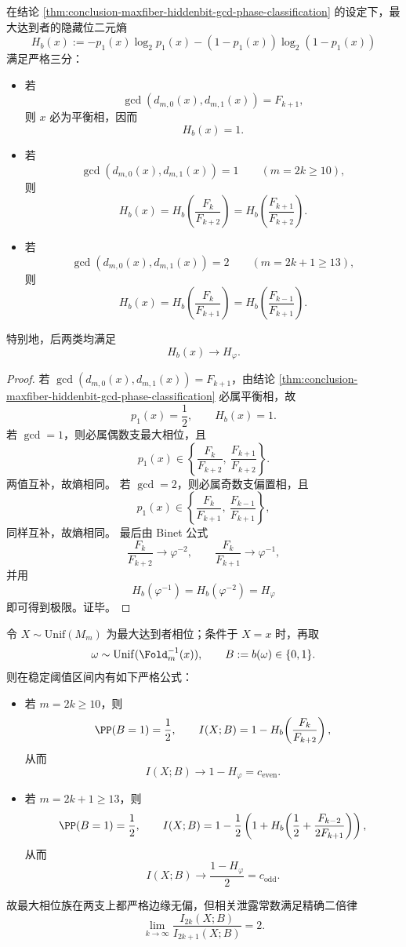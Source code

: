\begin{corollary}\label{cor:conclusion-maxfiber-gcd-determines-hiddenbit-entropy-class}
在结论 \ref{thm:conclusion-maxfiber-hiddenbit-gcd-phase-classification} 的设定下，最大达到者的隐藏位二元熵
\[
H_b(x):=
-p_1(x)\log_2 p_1(x)-(1-p_1(x))\log_2(1-p_1(x))
\]
满足严格三分：
\begin{itemize}
  \item 若
  \[
  \gcd(d_{m,0}(x),d_{m,1}(x))=F_{k+1},
  \]
  则 \(x\) 必为平衡相，因而
  \[
  H_b(x)=1.
  \]
  \item 若
  \[
  \gcd(d_{m,0}(x),d_{m,1}(x))=1
  \qquad (m=2k\ge 10),
  \]
  则
  \[
  H_b(x)
  =
  H_b\!\left(\frac{F_k}{F_{k+2}}\right)
  =
  H_b\!\left(\frac{F_{k+1}}{F_{k+2}}\right).
  \]
  \item 若
  \[
  \gcd(d_{m,0}(x),d_{m,1}(x))=2
  \qquad (m=2k+1\ge 13),
  \]
  则
  \[
  H_b(x)
  =
  H_b\!\left(\frac{F_k}{F_{k+1}}\right)
  =
  H_b\!\left(\frac{F_{k-1}}{F_{k+1}}\right).
  \]
\end{itemize}
特别地，后两类均满足
\[
H_b(x)\longrightarrow H_\varphi.
\]
\end{corollary}

\begin{proof}
若 \(\gcd(d_{m,0}(x),d_{m,1}(x))=F_{k+1}\)，由结论 \ref{thm:conclusion-maxfiber-hiddenbit-gcd-phase-classification} 必属平衡相，故
\[
p_1(x)=\frac12,
\qquad
H_b(x)=1.
\]
若 \(\gcd=1\)，则必属偶数支最大相位，且
\[
p_1(x)\in
\left\{
\frac{F_k}{F_{k+2}},\ \frac{F_{k+1}}{F_{k+2}}
\right\}.
\]
两值互补，故熵相同。
若 \(\gcd=2\)，则必属奇数支偏置相，且
\[
p_1(x)\in
\left\{
\frac{F_k}{F_{k+1}},\ \frac{F_{k-1}}{F_{k+1}}
\right\},
\]
同样互补，故熵相同。
最后由 Binet 公式
\[
\frac{F_k}{F_{k+2}}\to\varphi^{-2},
\qquad
\frac{F_k}{F_{k+1}}\to\varphi^{-1},
\]
并用
\[
H_b(\varphi^{-1})=H_b(\varphi^{-2})=H_\varphi
\]
即可得到极限。证毕。
\end{proof}

\begin{theorem}\label{thm:conclusion-maxfiber-hiddenbit-unbiased-marginal-biased-correlation}
令 \(X\sim \mathrm{Unif}(M_m)\) 为最大达到者相位；条件于 \(X=x\) 时，再取
\[
\omega\sim \mathrm{Unif}(\Fold_m^{-1}(x)),
\qquad
B:=b(\omega)\in\{0,1\}.
\]
则在稳定阈值区间内有如下严格公式：
\begin{itemize}
  \item 若 \(m=2k\ge 10\)，则
  \[
  \PP(B=1)=\frac12,
  \qquad
  I(X;B)=1-H_b\!\left(\frac{F_k}{F_{k+2}}\right),
  \]
  从而
  \[
  I(X;B)\longrightarrow 1-H_\varphi=c_{\mathrm{even}}.
  \]
  \item 若 \(m=2k+1\ge 13\)，则
  \[
  \PP(B=1)=\frac12,
  \qquad
  I(X;B)
  =
  1-\frac12\left(1+H_b\!\left(\frac12+\frac{F_{k-2}}{2F_{k+1}}\right)\right),
  \]
  从而
  \[
  I(X;B)\longrightarrow \frac{1-H_\varphi}{2}=c_{\mathrm{odd}}.
  \]
\end{itemize}
故最大相位族在两支上都严格边缘无偏，但相关泄露常数满足精确二倍律
\[
\lim_{k\to\infty}\frac{I_{2k}(X;B)}{I_{2k+1}(X;B)}=2.
\]
\end{theorem}


